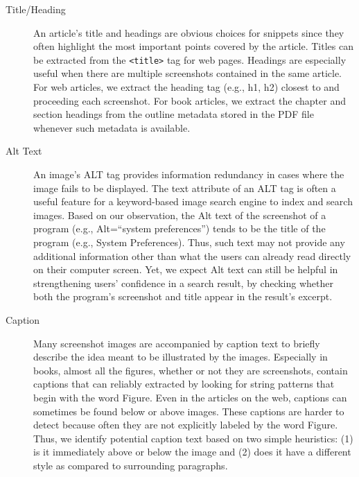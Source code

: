 \documentclass{www2010-submission}
\begin{document}
\begin{description}

\item[Title/Heading] An article's title and headings are 
  obvious choices for snippets since they often highlight the most
  important points covered by the article. Titles can be extracted
  from the \texttt{<title>} tag for web pages. Headings are especially useful
  when there are multiple screenshots contained in the same
  article. For web articles, we extract the heading tag (e.g., h1, h2)
  closest to and proceeding each screenshot. For book articles, we
  extract the chapter and section headings from the outline metadata
  stored in the PDF file whenever such metadata is available.

\item[Alt Text] An image's ALT tag provides information redundancy in
  cases where the image fails to be displayed. The text attribute of an
  ALT tag is often a useful feature for a keyword-based image search
  engine to index and search images. Based on our observation, the Alt
  text of the screenshot of a program (e.g., Alt=``system preferences'') tends
  to be the title of the program (e.g., System Preferences).
  Thus, such text may not provide any additional information other
  than what the users can already read directly on their computer
  screen. Yet, we expect Alt text can still be helpful in
  strengthening users' confidence in a search result, by checking
  whether both the program's screenshot and title appear in the
  result's excerpt.

\item[Caption] Many screenshot images are accompanied by caption text
  to briefly describe the idea meant to be illustrated by the images.
  Especially in books, almost all the figures, whether or not they are
  screenshots, contain captions that can reliably extracted by looking
  for string patterns that begin with the word Figure.  Even in the
  articles on the web, captions can sometimes be found below or above
  images. These captions are harder to detect because often they are
  not explicitly labeled by the word Figure. Thus, we identify
  potential caption text based on two simple heuristics: (1) is it
  immediately above or below the image and (2) does it have a
  different style as compared to surrounding paragraphs.


\end{description}
\end{document}
